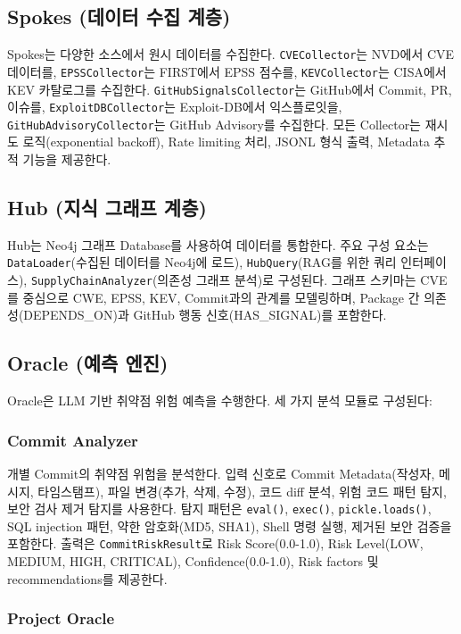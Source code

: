 ﻿\documentclass[conference]{IEEEtran}
\begin{document}
\subsection{Spokes (데이터 수집 계층)}

Spokes는 다양한 소스에서 원시 데이터를 수집한다. \texttt{CVECollector}는 NVD에서 CVE 데이터를, \texttt{EPSSCollector}는 FIRST에서 EPSS 점수를, \texttt{KEVCollector}는 CISA에서 KEV 카탈로그를 수집한다. \texttt{GitHubSignalsCollector}는 GitHub에서 Commit, PR, 이슈를, \texttt{ExploitDBCollector}는 Exploit-DB에서 익스플로잇을, \texttt{GitHubAdvisoryCollector}는 GitHub Advisory를 수집한다. 모든 Collector는 재시도 로직(exponential backoff), Rate limiting 처리, JSONL 형식 출력, Metadata 추적 기능을 제공한다.

\subsection{Hub (지식 그래프 계층)}

Hub는 Neo4j 그래프 Database를 사용하여 데이터를 통합한다. 주요 구성 요소는 \texttt{DataLoader}(수집된 데이터를 Neo4j에 로드), \texttt{HubQuery}(RAG를 위한 쿼리 인터페이스), \texttt{SupplyChainAnalyzer}(의존성 그래프 분석)로 구성된다. 그래프 스키마는 CVE를 중심으로 CWE, EPSS, KEV, Commit과의 관계를 모델링하며, Package 간 의존성(DEPENDS\_ON)과 GitHub 행동 신호(HAS\_SIGNAL)를 포함한다.

\subsection{Oracle (예측 엔진)}

Oracle은 LLM 기반 취약점 위험 예측을 수행한다. 세 가지 분석 모듈로 구성된다:

\subsubsection{Commit Analyzer}

개별 Commit의 취약점 위험을 분석한다. 입력 신호로 Commit Metadata(작성자, 메시지, 타임스탬프), 파일 변경(추가, 삭제, 수정), 코드 diff 분석, 위험 코드 패턴 탐지, 보안 검사 제거 탐지를 사용한다. 탐지 패턴은 \texttt{eval()}, \texttt{exec()}, \texttt{pickle.loads()}, SQL injection 패턴, 약한 암호화(MD5, SHA1), Shell 명령 실행, 제거된 보안 검증을 포함한다. 출력은 \texttt{CommitRiskResult}로 Risk Score(0.0-1.0), Risk Level(LOW, MEDIUM, HIGH, CRITICAL), Confidence(0.0-1.0), Risk factors 및 recommendations를 제공한다.

\subsubsection{Project Oracle}
\end{document}
